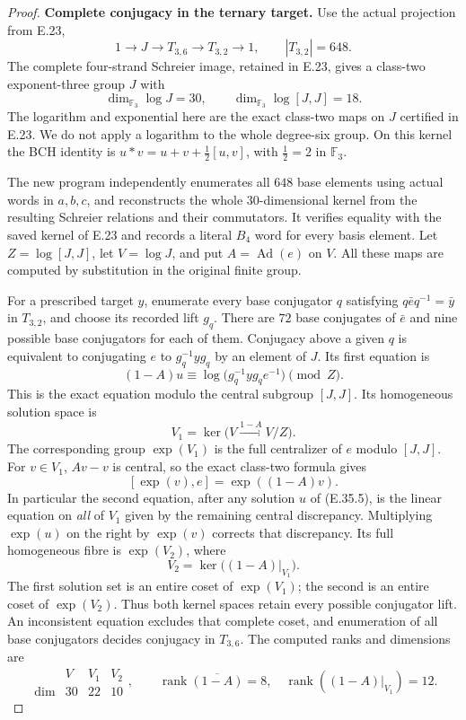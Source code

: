 \begin{proof}
\par\medskip\noindent\textbf{Complete conjugacy in the ternary target.}\quad
Use the actual projection from E.23,
\[
 1\longrightarrow J\longrightarrow T_{3,6}
       \longrightarrow T_{3,2}\longrightarrow1,
       \qquad |T_{3,2}|=648.
 \tag{E.35.3}
\]
The complete four-strand Schreier image, retained in
E.23, gives a class-two exponent-three group $J$ with
\[
 \dim_{\mathbb F_3}\log J=30,\qquad
 \dim_{\mathbb F_3}\log[J,J]=18.
 \tag{E.35.4}
\]
The logarithm and exponential here are the exact
class-two maps on $J$ certified in E.23. We do not
apply a logarithm to the whole degree-six group.
On this kernel the BCH identity is
$u*v=u+v+\frac12[u,v]$, with $\frac12=2$ in
$\mathbb F_3$.

The new program independently enumerates all $648$
base elements using actual words in $a,b,c$, and
reconstructs the whole $30$-dimensional kernel from
the resulting Schreier relations and their commutators.
It verifies equality with the saved kernel of E.23
and records a literal $B_4$ word for every basis
element. Let $Z=\log[J,J]$, let
$V=\log J$, and put $A=\operatorname{Ad}(e)$ on $V$.
All these maps are computed by substitution in the
original finite group.

For a prescribed target $y$, enumerate every base
conjugator $q$ satisfying
$q\bar e q^{-1}=\bar y$ in $T_{3,2}$, and choose its
recorded lift $g_q$. There are $72$ base conjugates
of $\bar e$ and nine possible base conjugators for
each of them. Conjugacy above a given $q$ is equivalent
to conjugating $e$ to $g_q^{-1}yg_q$ by an element
of $J$. Its first equation is
\[
 (1-A)u\equiv
   \log\bigl(g_q^{-1}yg_qe^{-1}\bigr)\pmod Z.
 \tag{E.35.5}
\]
This is the exact equation modulo the central subgroup
$[J,J]$. Its homogeneous solution space is
\[
 V_1=\ker\bigl(V\xrightarrow{1-A}V/Z\bigr).
\]
The corresponding group $\exp(V_1)$ is the full
centralizer of $e$ modulo $[J,J]$. For $v\in V_1$,
$Av-v$ is central, so the exact class-two formula gives
\[
                    [\exp(v),e]=\exp((1-A)v).
 \tag{E.35.6}
\]
In particular the second equation, after any solution
$u$ of (E.35.5), is the linear equation on \emph{all}
of $V_1$ given by the remaining central discrepancy.
Multiplying $\exp(u)$ on the right by $\exp(v)$
corrects that discrepancy. Its full homogeneous fibre
is $\exp(V_2)$, where
\[
 V_2=\ker\bigl((1-A)|_{V_1}\bigr).
 \tag{E.35.7}
\]
The first solution set is an entire coset of
$\exp(V_1)$; the second is an entire coset of
$\exp(V_2)$. Thus both kernel spaces retain every
possible conjugator lift. An inconsistent equation
excludes that complete coset, and enumeration of all
base conjugators decides conjugacy in $T_{3,6}$.
The computed ranks and dimensions are
\[
 \begin{array}{c|ccc}
       &V&V_1&V_2\\\hline
 \dim&30&22&10
 \end{array},
 \qquad
 \operatorname{rank}\overline{(1-A)}=8,
 \quad\operatorname{rank}((1-A)|_{V_1})=12.
 \tag{E.35.8}
\]


\end{proof}
